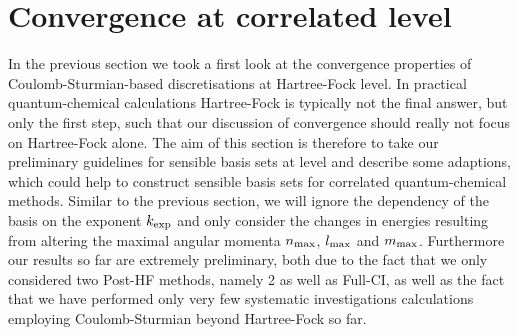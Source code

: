 \section{Convergence at correlated level}


In the previous section we took a first look at the convergence
properties of Coulomb-Sturmian-based discretisations at Hartree-Fock level.
In practical quantum-chemical calculations Hartree-Fock is typically
not the final answer,
but only the first step,
such that our discussion of convergence should really not focus on Hartree-Fock alone.
The aim of this section is therefore to take our preliminary guidelines
for sensible basis sets at \HF level and describe some adaptions,
which could help to construct sensible \CS basis sets for correlated
quantum-chemical methods.
Similar to the previous section, we will ignore the dependency
of the \CS basis on the exponent $k_\text{exp}$ and only consider
the changes in energies resulting from
altering the maximal angular momenta $n_\text{max}$, $l_\text{max}$ and $m_\text{max}$.
Furthermore our results so far are extremely preliminary,
both due to the fact that we only considered two Post-HF methods,
namely {\MP}2 as well as Full-CI,
as well as the fact that we have performed only very few
systematic investigations
calculations employing Coulomb-Sturmian beyond Hartree-Fock so far.

